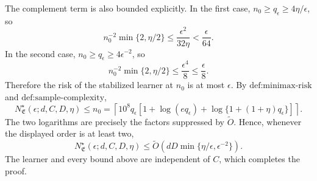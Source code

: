 The complement term is also bounded explicitly. In the first case, \(n_0\ge q_\epsilon\ge4\eta/\epsilon\), so
\[
n_0^{-2}\min\{2,\eta/2\}
\le\frac{\epsilon^2}{32\eta}<\frac\epsilon{64}.
\]
In the second case, \(n_0\ge q_\epsilon\ge4\epsilon^{-2}\), so
\[
n_0^{-2}\min\{2,\eta/2\}
\le\frac{\epsilon^4}{8}\le\frac\epsilon8.
\]
Therefore the risk of the stabilized learner at \(n_0\) is at most \(\epsilon\). By \(\text{def:minimax-risk}\) and \(\text{def:sample-complexity}\),
\[
N^\star_{\mathfrak E}(\epsilon;d,C,D,\eta)
\le n_0
=\left\lceil10^8q_\epsilon
\left[1+\log(eq_\epsilon)+\log\{1+(1+\eta)q_\epsilon\}\right]\right\rceil.
\]
The two logarithms are precisely the factors suppressed by \(\widetilde O\). Hence, whenever the displayed order is at least two,
\[
N^\star_{\mathfrak E}(\epsilon;d,C,D,\eta)
\le\widetilde O\left(dD\min\{\eta/\epsilon,\epsilon^{-2}\}\right).
\]
The learner and every bound above are independent of \(C\), which completes the proof.